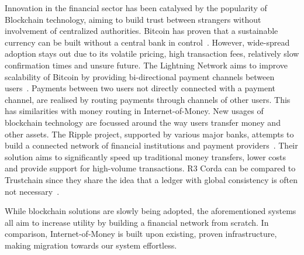 Innovation in the financial sector has been catalysed by the popularity of Blockchain technology, aiming to build trust between strangers without involvement of centralized authorities.
Bitcoin has proven that a sustainable currency can be built without a central bank in control~\cite{nakamoto2008bitcoin}.
However, wide-spread adoption stays out due to its volatile pricing, high transaction fees, relatively slow confirmation times and unsure future.
The Lightning Network aims to improve scalability of Bitcoin by providing bi-directional payment channels between users~\cite{poon2015bitcoin}.
Payments between two users not directly connected with a payment channel, are realised by routing payments through channels of other users.
This has similarities with money routing in Internet-of-Money.
New usages of blockchain technology are focussed around the way users transfer money and other assets.
The Ripple project, supported by various major banks, attempts to build a connected network of financial institutions and payment providers~\cite{schwartz2014ripple}.
Their solution aims to significantly speed up traditional money transfers, lower costs and provide support for high-volume transactions.
R3 Corda can be compared to Trustchain since they share the idea that a ledger with global consistency is often not necessary~\cite{brown2016introducing}.

While blockchain solutions are slowly being adopted, the aforementioned systems all aim to increase utility by building a financial network from scratch.
In comparison, Internet-of-Money is built upon existing, proven infrastructure, making migration towards our system effortless.



